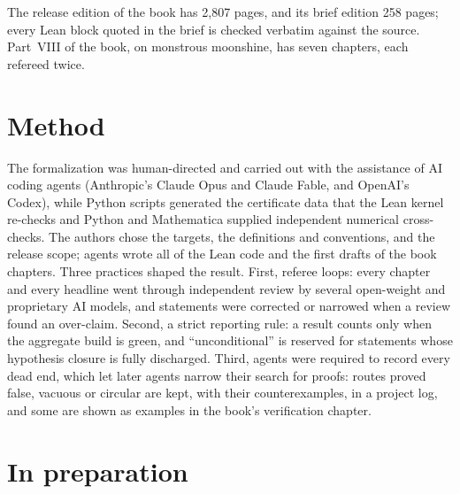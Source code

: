 \documentclass[10pt]{article}
\begin{document}
The release edition of the book has 2{,}807 pages, and its brief edition 258 pages; every Lean block quoted in
the brief is checked verbatim against the source. Part~VIII of the book, on monstrous moonshine, has seven chapters,
each refereed twice.

\section{Method}

The formalization was human-directed and carried out with the assistance of AI coding agents (Anthropic's
Claude Opus and Claude Fable, and OpenAI's Codex), while Python scripts generated the certificate data that the Lean
kernel re-checks and Python and Mathematica supplied independent numerical cross-checks. The authors chose the
targets, the definitions and conventions, and the release scope; agents wrote all of the Lean code and the first
drafts of the book chapters. Three practices shaped the result. First, referee loops: every chapter and every
headline went through independent review by several open-weight and proprietary AI models, and statements were
corrected or narrowed when a review found an over-claim. Second, a strict reporting rule: a result counts only when the aggregate build is green, and
``unconditional'' is reserved for statements whose hypothesis closure is fully discharged. Third, agents were required to record every dead
end, which let later agents narrow their search for proofs:
routes proved false, vacuous or circular are kept, with their counterexamples, in a project log, and some are shown as
examples in the book's verification chapter.

\section{In preparation}\label{sec:prep}
\end{document}
